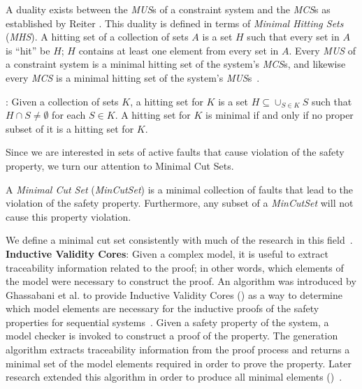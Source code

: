 A duality exists between the \textit{MUS}s of a constraint system and the \textit{MCS}s as established by Reiter \cite{reiter1987theory}. This duality is defined in terms of \textit{Minimal Hitting Sets} (\textit{MHS}). A hitting set of a collection of sets $A$ is a set $H$ such that every set in $A$ is ``hit'' be $H$; $H$ contains at least one element from every set in $A$. Every \textit{MUS} of a constraint system is a minimal hitting set of the system's \textit{MCS}s, and likewise every \textit{MCS} is a minimal hitting set of the system's \textit{MUS}s~\cite{liffiton2016fast, reiter1987theory, de1987diagnosing}.
\begin{definition}: Given a collection of sets $K$, a hitting set for $K$ is a set $H \subseteq \cup_{S \in K} S$ such that $H \cap S \neq \emptyset$ for each $S  \in K$. A hitting set for $K$ is minimal if and only if no proper subset of it is a hitting set for $K$. 
\end{definition}
\noindent
Since we are interested in sets of active faults that cause violation of the safety property, we turn our attention to Minimal Cut Sets. 
\begin{definition}
A \textit{Minimal Cut Set} (\textit{MinCutSet}) is a minimal collection of faults that lead to the violation of the safety property. Furthermore, any subset of a \textit{MinCutSet} will not cause this property violation. 
\end{definition}
\noindent
We define a minimal cut set consistently with much of the research in this field~\cite{0f356f05e72f43018211b36f97c8854a,historyFTA}.\\

\textbf{Inductive Validity Cores}: Given a complex model, it is useful to extract traceability information related to the proof; in other words, which elements of the model were necessary to construct the proof. An algorithm was introduced by Ghassabani et al. to provide Inductive Validity Cores (\ivc) as a way to determine which model elements are necessary for the inductive proofs of the safety properties for sequential systems~\cite{GhassabaniGW16}. Given a safety property of the system, a model checker is invoked to construct a proof of the property. The \ivc generation algorithm extracts traceability information from the proof process and returns a minimal set of the model elements required in order to prove the property. Later research extended this algorithm in order to produce all minimal \ivc elements (\aivcalg)~\cite{Ghassabani2017EfficientGO,bendik2018online}. 

